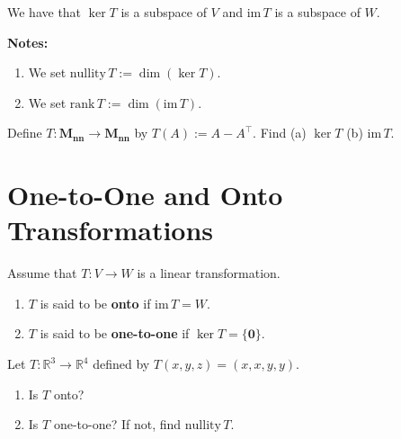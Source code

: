 \documentclass[20pt,a4paper]{extarticle}
\newcommand{\ra}{\rightarrow}
\newcounter{example}
\newcounter{theorem}
\newcounter{definition}
\begin{document}
\vspace*{16pt}

\begin{theorem}
We have that $\ker T$ is a subspace of $V$ and $\mathrm{im} \, T$ is a subspace of $W$.
\end{theorem}

\textbf{Notes:}
	\begin{enumerate}[label=\Circled{\arabic*}]
		\item We set $\mathrm{nullity}\,T := \dim (\ker T)$.
		\item We set $\mathrm{rank}\, T := \dim (\mathrm{im} \, T )$. 
	\end{enumerate}

\newpage 

\begin{example}
Define $T : \mathbf{M_{nn}} \ra \mathbf{M_{nn}}$ by $T (A) := A - A^\top$. Find (a) $\ker T$ (b) $\mathrm{im} \, T$.
\end{example}

\begin{solution}

\end{solution}

\newpage 

\phantom{2}

\newpage 

\section{One-to-One and Onto Transformations}

\begin{definition}
Assume that $T: V \ra W$ is a linear transformation.
	\begin{enumerate}[label=\Circled{\arabic*}] 
		\item $T$ is said to be \textbf{onto} if $\mathrm{im} \, T = W$.
		\item $T$ is said to be \textbf{one-to-one} if $\ker T = \{ \mathbf{0} \}$. 
	\end{enumerate}
\end{definition}

\vspace*{16pt}

\begin{example}
Let $T :  \mathbb{R}^3 \ra \mathbb{R}^4$ defined by $T (x, y, z) = (x, x, y, y)$.
	\begin{enumerate}[label=\alph*)]
		\item Is $T$ onto?
		\item Is $T$ one-to-one? If not, find $\mathrm{nullity} \, T$.
	\end{enumerate}
\end{example}
\end{document}
